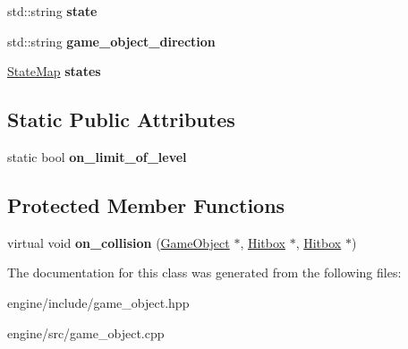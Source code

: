 \begin{DoxyCompactItemize}
\item 
std\+::string {\bfseries state}\hypertarget{classengine_1_1_game_object_a485c6dde0f7daed4ce480d577e621f87}{}\label{classengine_1_1_game_object_a485c6dde0f7daed4ce480d577e621f87}

\item 
std\+::string {\bfseries game\+\_\+object\+\_\+direction}\hypertarget{classengine_1_1_game_object_a44e5d9209f5ff0f19d83f7d221037632}{}\label{classengine_1_1_game_object_a44e5d9209f5ff0f19d83f7d221037632}

\item 
\hyperlink{classengine_1_1_state_map}{State\+Map} {\bfseries states}\hypertarget{classengine_1_1_game_object_a109beba63a929e3be8c4c958591cd1a9}{}\label{classengine_1_1_game_object_a109beba63a929e3be8c4c958591cd1a9}

\end{DoxyCompactItemize}
\subsection*{Static Public Attributes}
\begin{DoxyCompactItemize}
\item 
static bool {\bfseries on\+\_\+limit\+\_\+of\+\_\+level}\hypertarget{classengine_1_1_game_object_aea78ad4cdb280a61b050b89a280af7bd}{}\label{classengine_1_1_game_object_aea78ad4cdb280a61b050b89a280af7bd}

\end{DoxyCompactItemize}
\subsection*{Protected Member Functions}
\begin{DoxyCompactItemize}
\item 
virtual void {\bfseries on\+\_\+collision} (\hyperlink{classengine_1_1_game_object}{Game\+Object} $\ast$, \hyperlink{classengine_1_1_hitbox}{Hitbox} $\ast$, \hyperlink{classengine_1_1_hitbox}{Hitbox} $\ast$)\hypertarget{classengine_1_1_game_object_a0bf122fe605b95a4b156e28252a167ee}{}\label{classengine_1_1_game_object_a0bf122fe605b95a4b156e28252a167ee}

\end{DoxyCompactItemize}


The documentation for this class was generated from the following files\+:\begin{DoxyCompactItemize}
\item 
engine/include/game\+\_\+object.\+hpp\item 
engine/src/game\+\_\+object.\+cpp\end{DoxyCompactItemize}
